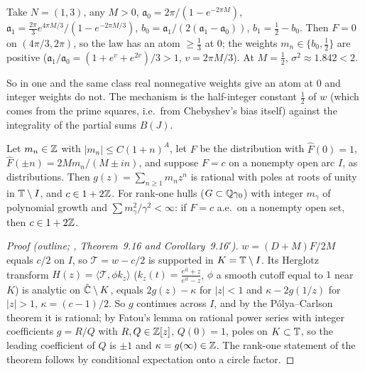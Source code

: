 \begin{example}\label{ex:real}
Take $N=(1,3)$, any $M>0$, $\mathfrak a_0=2\pi/(1-e^{-2\pi M})$, $\mathfrak a_1=\frac{2\pi}3e^{4\pi M/3}/(1-e^{-2\pi M/3})$, $b_0=\mathfrak a_1/(2(\mathfrak a_1-\mathfrak a_0))$, $b_1=\frac12-b_0$. Then $F=0$ on $(4\pi/3,2\pi)$, so the law has an atom $\ge\frac13$ at $0$; the weights $m_n\in\{b_0,\frac12\}$ are positive ($\mathfrak a_1/\mathfrak a_0=(1+e^v+e^{2v})/3>1$, $v=2\pi M/3$). At $M=\frac12$, $\sigma^2\approx1.842<2$.
\end{example}

So in one and the same class real nonnegative weights give an atom at $0$ and integer weights do not. The mechanism is the half-integer constant $\frac12$ of $w$ (which comes from the prime squares, i.e.\ from Chebyshev's bias itself) against the integrality of the partial sums $B(J)$.

\begin{theorem}\label{thm:arcs}
Let $m_n\in\mathbb Z$ with $|m_n|\le C(1+n)^A$, let $F$ be the distribution with $\hat F(0)=1$, $\hat F(\pm n)=2Mm_n/(M\pm in)$, and suppose $F=c$ on a nonempty open arc $I$, as distributions. Then $g(z)=\sum_{n\ge1}m_nz^n$ is rational with poles at roots of unity in $\mathbb T\setminus I$, and $c\in1+2\mathbb Z$. For rank-one hulls ($G\subset\mathbb Q\gamma_0$) with integer $m_\gamma$ of polynomial growth and $\sum m_\gamma^2/\gamma^2<\infty$: if $F=c$ a.e.\ on a nonempty open set, then $c\in1+2\mathbb Z$.
\end{theorem}

\begin{proof}[Proof (outline; , Theorem~9.16 and Corollary~9.16$'$)]
$w=(D+M)F/2M$ equals $c/2$ on $I$, so $\mathcal T=w-c/2$ is supported in $K=\mathbb T\setminus I$. Its Herglotz transform $H(z)=\langle\mathcal T,\phi k_z\rangle$ ($k_z(t)=\frac{e^{it}+z}{e^{it}-z}$, $\phi$ a smooth cutoff equal to $1$ near $K$) is analytic on $\hat{\mathbb C}\setminus K$, equals $2g(z)-\kappa$ for $|z|<1$ and $\kappa-2g(1/z)$ for $|z|>1$, $\kappa=(c-1)/2$. So $g$ continues across $I$, and by the P\'olya--Carlson theorem \cite{Carlson,Polya} it is rational; by Fatou's lemma on rational power series with integer coefficients $g=R/Q$ with $R,Q\in\mathbb Z[z]$, $Q(0)=1$, poles on $K\subset\mathbb T$, so the leading coefficient of $Q$ is $\pm1$ and $\kappa=g(\infty)\in\mathbb Z$. The rank-one statement of the theorem follows by conditional expectation onto a circle factor.
\end{proof}

